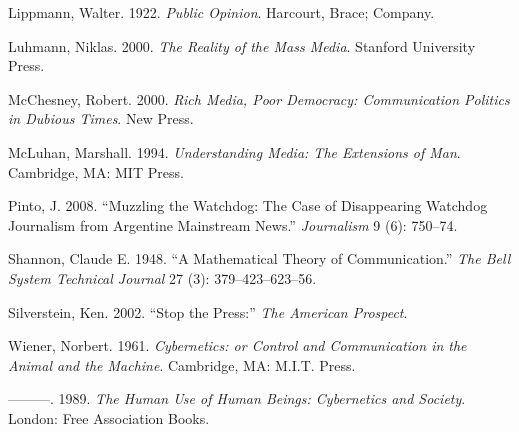 \documentclass[12pt,book]{article}
\begin{document}
Lippmann, Walter. 1922. \emph{Public Opinion}. Harcourt, Brace; Company.

Luhmann, Niklas. 2000. \emph{The Reality of the Mass Media}. Stanford
University Press.

McChesney, Robert. 2000. \emph{Rich Media, Poor Democracy: Communication
Politics in Dubious Times}. New Press.

McLuhan, Marshall. 1994. \emph{Understanding Media: The Extensions of
Man}. Cambridge, MA: MIT Press.

Pinto, J. 2008. ``Muzzling the Watchdog: The Case of Disappearing
Watchdog Journalism from Argentine Mainstream News.'' \emph{Journalism}
9 (6): 750--74.

Shannon, Claude E. 1948. ``A Mathematical Theory of Communication.''
\emph{The Bell System Technical Journal} 27 (3): 379--423--623--56.

Silverstein, Ken. 2002. ``Stop the Press:'' \emph{The American
Prospect}.

Wiener, Norbert. 1961. \emph{Cybernetics: or Control and Communication
in the Animal and the Machine}. Cambridge, MA: M.I.T. Press.

---------. 1989. \emph{The Human Use of Human Beings: Cybernetics and
Society}. London: Free Association Books.
\end{document}
